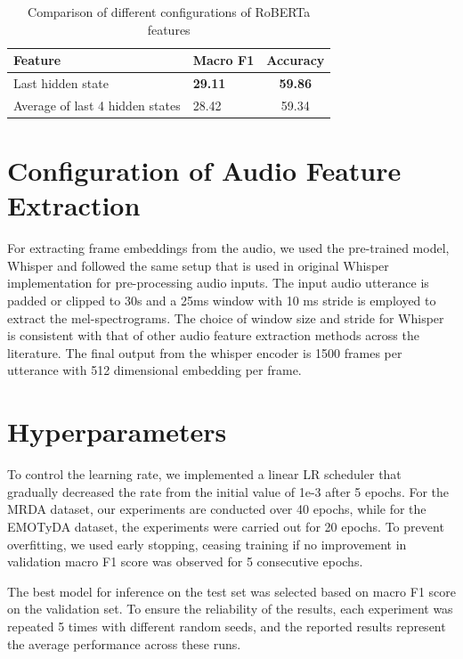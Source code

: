\begin{table}
  \centering
  \small
  \begin{tabularx}{\linewidth}{Xlc}
    \toprule
    Feature & Macro F1 & Accuracy \\
    \midrule
    Last hidden state & \textbf{29.11} & \textbf{59.86} \\
    Average of last 4 hidden states & 28.42 & 59.34  \\
    \bottomrule
  \end{tabularx}
  \caption{Comparison of different configurations of RoBERTa features}
  \label{tab:roberta}
\end{table}


\section{Configuration of Audio Feature Extraction}
\label{sec:whisper configuration}
For extracting frame embeddings from the audio, we used the pre-trained model, Whisper and followed the same setup that is used in original Whisper implementation for pre-processing audio inputs. The input audio utterance is padded or clipped to 30s and a 25ms window with 10 ms stride is employed to extract the mel-spectrograms. The choice of window size and stride for Whisper is consistent with that of other audio feature extraction methods across the literature. The final output from the whisper encoder is 1500 frames per utterance with 512 dimensional embedding per frame. 

\section{Hyperparameters}
\label{sec:hyperparameters}

To control the learning rate, we implemented a linear LR scheduler that gradually decreased the rate from the initial value of 1e-3 after 5 epochs.
For the MRDA dataset, our experiments are conducted over 40 epochs, while for the EMOTyDA dataset, the experiments were carried out for 20 epochs. To prevent overfitting, we used early stopping, ceasing training if no improvement in validation macro F1 score was observed for 5 consecutive epochs.  

The best model for inference on the test set was selected based on macro F1 score on the validation set.
To ensure the reliability of the results, each experiment was repeated 5 times with different random seeds, and the reported results represent the average performance across these runs.

